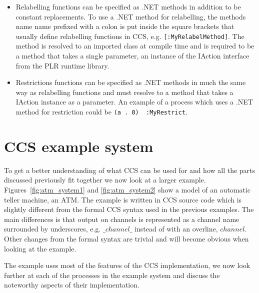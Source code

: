 \begin{itemize}
		\item Relabelling functions can be specified as .NET methods in addition 
		to be constant replacements. To use a .NET method for relabelling, the 
		methods name name prefixed with a colon is put inside the square brackets 
		that usually define relabelling functions in CCS, e.g.
		\texttt{[:MyRelabelMethod]}. The method is resolved to an imported class 
		at compile time and is required to be a method that takes a single 
		parameter, an instance of the \textsf{IAction} interface from the PLR 
		runtime library.
		
		\item Restrictions functions can be specified as .NET methods in much the 
		same way as relabelling functions and must resolve to a method that takes 
		a \textsf{IAction} instance as a parameter. An example of a process which 
		uses a .NET method for restriction could be \texttt{(a . 0) \ :MyRestrict}.

	\end{itemize}

\section{CCS example system}

  To get a better understanding of what CCS can be used for and how all the 
  parts discussed previously fit together we now look at a larger example. 
  Figures~\ref{fig:atm_system1} and \ref{fig:atm_system2} show a model 
  of an automatic teller machine, an ATM. The example is written in CCS source 
  code which is slightly different from the formal CCS syntax used in the 
  previous examples. The main differences is that output on channels is 
  represented as a channel name surrounded by underscores, e.g. $\_channel\_$ 
  instead of with an overline, $\overline{channel}$. Other changes from the 
  formal syntax are trivial and will become obvious when looking at the 
  example.
  
  The example uses most of the features of the CCS implementation, we now look 
  further at each of the processes in the example system and discuss the 
  noteworthy aspects of their implementation.
  
  
  
